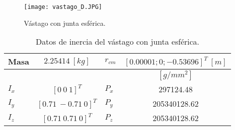 
\begin{figure}[htb!]
    \centering
    \texttt{[image: vastago\_D.JPG]}
    \caption{Vástago con junta esférica.}
    \label{fig:my_label}
\end{figure}

\begin{table}[hb!]
 \begin{center}
\begin{tabular}{lclc}


% 

 Masa & $ 2.25414\ [kg]$ & $r_{cm}$ & $[0.00001; 0; -0.53696]^T \ [m]$  \\
 \hline
 & & & $[g/mm^2]$\\
 \hline
 $ I_x $ & $ [0 \ 0 \ 1]^T $ & $ P_x $ & 297124.48\\
 $ I_y $ & $ [0.71 \ -0.71 \ 0]^T $ & $ P_y $ & 205340128.62\\
 $ I_z $ & $ [0.71 \ 0.71 \ 0]^T $ & $ P_z $ & 205340128.62
\end{tabular}
\end{center}
\caption{Datos de inercia del vástago con junta esférica.}
\label{tab: inertia table joint}
\end{table}
